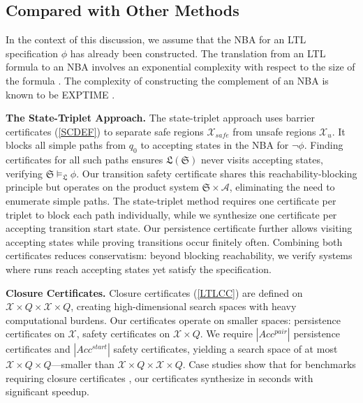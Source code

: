 \subsection{Compared with Other Methods}
In the context of this discussion, we assume that the NBA for an LTL specification $\phi$ has already been constructed. The translation from an LTL formula to an NBA involves an exponential complexity with respect to the size of the formula \cite{vardi2005automata}. The complexity of constructing the complement of an NBA is known to be EXPTIME \cite{complementnba}.

\textbf{The State-Triplet Approach.} The state-triplet approach \cite{wongpiromsarn2015automata} uses barrier certificates (\ref{SCDEF}) to separate safe regions $\mathcal{X}_{safe}$ from unsafe regions $\mathcal{X}_{u}$. It blocks all simple paths from $q_0$ to accepting states in the NBA for $\neg\phi$. Finding certificates for all such paths ensures $\mathfrak{L}(\mathfrak{S})$ never visits accepting states, verifying $\mathfrak{S} \models_{\mathfrak{L}} \phi$. Our transition safety certificate shares this reachability-blocking principle but operates on the product system $\mathfrak{S} \times \mathcal{A}$, eliminating the need to enumerate simple paths. The state-triplet method requires one certificate per triplet to block each path individually, while we synthesize one certificate per accepting transition start state. Our persistence certificate further allows visiting accepting states while proving transitions occur finitely often. Combining both certificates reduces conservatism: beyond blocking reachability, we verify systems where runs reach accepting states yet satisfy the specification.

\textbf{Closure Certificates.} Closure certificates (\ref{LTLCC}) are defined on $\mathcal{X} \times Q \times \mathcal{X} \times Q$, creating high-dimensional search spaces with heavy computational burdens. Our certificates operate on smaller spaces: persistence certificates on $\mathcal{X}$, safety certificates on $\mathcal{X} \times Q$. We require $|Acc^{pair}|$ persistence certificates and $|Acc^{start}|$ safety certificates, yielding a search space of at most $\mathcal{X} \times Q \times Q$—smaller than $\mathcal{X} \times Q \times \mathcal{X} \times Q$. Case studies show that for benchmarks requiring closure certificates \cite{murali2024closure}, our certificates synthesize in seconds with significant speedup.
